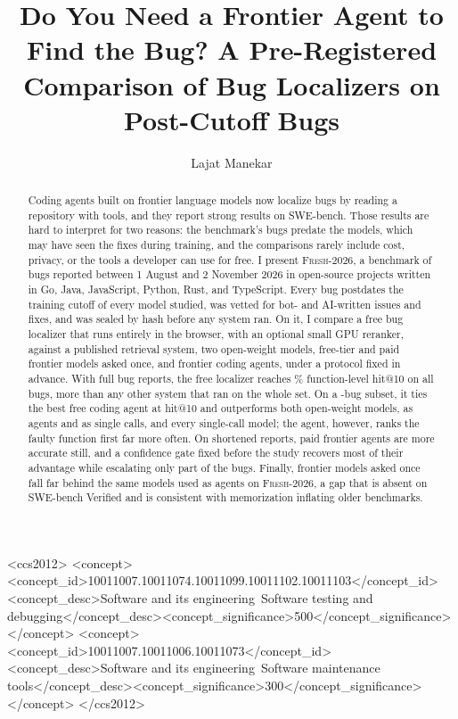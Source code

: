 \documentclass[acmsmall,screen,review,anonymous]{acmart}
\newcommand{\fresh}{\textsc{Fresh-2026}\xspace}
\newcommand{\FFA}{fresh-full}
\begin{document}
\title{Do You Need a Frontier Agent to Find the Bug? A Pre-Registered Comparison of Bug Localizers on Post-Cutoff Bugs}

\author{Lajat Manekar}

\begin{abstract}
Coding agents built on frontier language models now localize bugs by reading a repository with tools, and they report strong results on SWE-bench. Those results are hard to interpret for two reasons: the benchmark's bugs predate the models, which may have seen the fixes during training, and the comparisons rarely include cost, privacy, or the tools a developer can use for free. I present \fresh, a benchmark of \NBugs{} bugs reported between 1 August and 2 November 2026 in \NProjects{} open-source projects written in Go, Java, JavaScript, Python, Rust, and TypeScript. Every bug postdates the training cutoff of every model studied, was vetted for bot- and AI-written issues and fixes, and was sealed by hash before any system ran. On it, I compare a free bug localizer that runs entirely in the browser, with an optional small GPU reranker, against a published retrieval system, two open-weight models, free-tier and paid frontier models asked once, and frontier coding agents, under a protocol fixed in advance. With full bug reports, the free localizer reaches \res{\FFA}{website-gpu}{hit@10}\% function-level hit@10 on all \NBugs{} bugs, more than any other system that ran on the whole set. On a \NAgent{}-bug subset, it ties the best free coding agent at hit@10 and outperforms both open-weight models, as agents and as single calls, and every single-call model; the agent, however, ranks the faulty function first far more often. On shortened reports, paid frontier agents are more accurate still, and a confidence gate fixed before the study recovers most of their advantage while escalating only part of the bugs. Finally, frontier models asked once fall far behind the same models used as agents on \fresh, a gap that is absent on SWE-bench Verified and is consistent with memorization inflating older benchmarks.
\end{abstract}

\begin{CCSXML}
<ccs2012>
<concept><concept_id>10011007.10011074.10011099.10011102.10011103</concept_id><concept_desc>Software and its engineering~Software testing and debugging</concept_desc><concept_significance>500</concept_significance></concept>
<concept><concept_id>10011007.10011006.10011073</concept_id><concept_desc>Software and its engineering~Software maintenance tools</concept_desc><concept_significance>300</concept_significance></concept>
</ccs2012>
\end{CCSXML}
\end{document}
